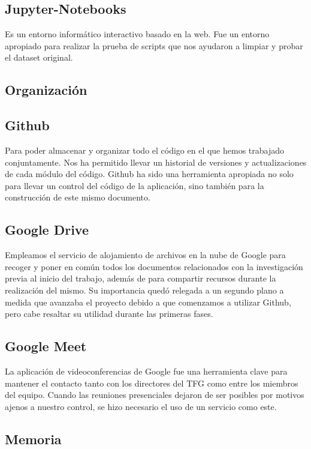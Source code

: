 \subsection*{Jupyter-Notebooks}

Es un entorno informático interactivo basado en la web. Fue un entorno apropiado para realizar la prueba de scripts que nos ayudaron a limpiar y probar el dataset original.

\subsection{Organización}

\subsection*{Github}

Para poder almacenar y organizar todo el código en el que hemos trabajado conjuntamente. Nos ha permitido llevar un historial de versiones y actualizaciones de cada módulo del código. Github ha sido una herramienta apropiada no solo para llevar un control del código de la aplicación, sino también para la construcción de este mismo documento.

\subsection*{Google Drive}

Empleamos el servicio de alojamiento de archivos en la nube de Google para recoger y poner en común todos los documentos relacionados con la investigación previa al inicio del trabajo, además de para compartir recursos durante la realización del mismo. Su importancia quedó relegada a un segundo plano a medida que avanzaba el proyecto debido a que comenzamos a utilizar Github, pero cabe resaltar su utilidad durante las primeras fases.

\subsection*{Google Meet}

La aplicación de videoconferencias de Google fue una herramienta clave para mantener el contacto tanto con los directores del TFG como entre los miembros del equipo. Cuando las reuniones presenciales dejaron de ser posibles por motivos ajenos a nuestro control, se hizo necesario el uso de un servicio como este.

\subsection{Memoria}

